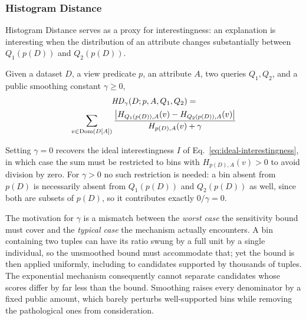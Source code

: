 
\subsubsection{Histogram Distance}
\label{subsubsec:histogram-distance}

Histogram Distance serves as a proxy for interestingness: an explanation is interesting when the distribution of an attribute changes substantially between $Q_1(p(D))$ and $Q_2(p(D))$.

\begin{definition}
\label{def:hd}
Given a dataset $D$, a view predicate $p$, an attribute $A$, two queries $Q_1,Q_2$, and a public smoothing constant $\gamma \ge 0$,
\begin{multline}
\mathit{HD}_\gamma(D;p,A,Q_1,Q_2) = \\
\sum_{v\in \operatorname{Dom}(D[A])}
\frac{\big|H_{Q_1(p(D)),A}(v)-H_{Q_2(p(D)),A}(v)\big|}
     {H_{p(D),A}(v)+\gamma}
\label{eq:hd-definition}
\end{multline}
\end{definition}

Setting $\gamma=0$ recovers the ideal interestingness $I$ of Eq.~\eqref{eq:ideal-interestingness}, in which case the sum must be restricted to bins with $H_{p(D),A}(v)>0$ to avoid division by zero.
For $\gamma>0$ no such restriction is needed: a bin absent from $p(D)$ is necessarily absent from $Q_1(p(D))$ and $Q_2(p(D))$ as well, since both are subsets of $p(D)$, so it contributes exactly $0/\gamma=0$.

The motivation for $\gamma$ is a mismatch between the \emph{worst case} the sensitivity bound must cover and the \emph{typical case} the mechanism actually encounters.
A bin containing two tuples can have its ratio swung by a full unit by a single individual, so the unsmoothed bound must accommodate that; yet the bound is then applied uniformly, including to candidates supported by thousands of tuples.
The exponential mechanism consequently cannot separate candidates whose scores differ by far less than the bound.
Smoothing raises every denominator by a fixed public amount, which barely perturbs well-supported bins while removing the pathological ones from consideration.

